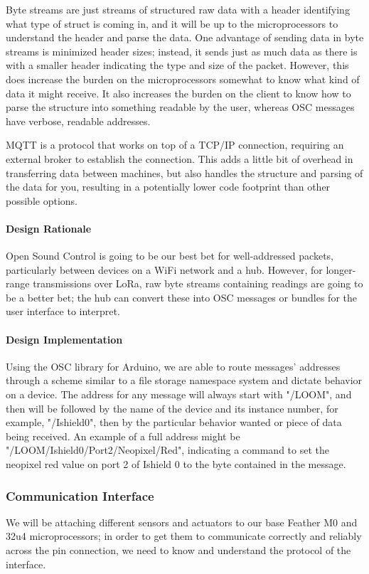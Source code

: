 \documentclass[onecolumn, draftclsnofoot,10pt, compsoc]{IEEEtran}
\begin{document}
    Byte streams are just streams of structured raw data with a header identifying what type of struct is coming in, and it will be up to the microprocessors to understand the header and parse the data. One advantage of sending data in byte streams is minimized header sizes; instead, it sends just as much data as there is with a smaller header indicating the type and size of the packet. However, this does increase the burden on the microprocessors somewhat to know what kind of data it might receive. It also increases the burden on the client to know how to parse the structure into something readable by the user, whereas OSC messages have verbose, readable addresses.

    MQTT \cite{MQTT} is a protocol that works on top of a TCP/IP connection, requiring an external broker to establish the connection. This adds a little bit of overhead in transferring data between machines, but also handles the structure and parsing of the data for you, resulting in a potentially lower code footprint than other possible options. 

\paragraph{Design Rationale}
    Open Sound Control is going to be our best bet for well-addressed packets, particularly between devices on a WiFi network and a hub. However, for longer-range transmissions over LoRa, raw byte streams containing readings are going to be a better bet; the hub can convert these into OSC messages or bundles for the user interface to interpret. 

\paragraph{Design Implementation}
    Using the OSC library for Arduino, we are able to route messages' addresses through a scheme similar to a file storage namespace system and dictate behavior on a device. The address for any message will always start with "/LOOM", and then will be followed by the name of the device and its instance number, for example, "/Ishield0", then by the particular behavior wanted or piece of data being received. An example of a full address might be "/LOOM/Ishield0/Port2/Neopixel/Red", indicating a command to set the neopixel red value on port 2 of Ishield 0 to the byte contained in the message. 


\subsubsection{Communication Interface}
    We will be attaching different sensors and actuators to our base Feather M0 and 32u4 microprocessors; in order to get them to communicate correctly and reliably across the pin connection, we need to know and understand the protocol of the interface. 
\end{document}
